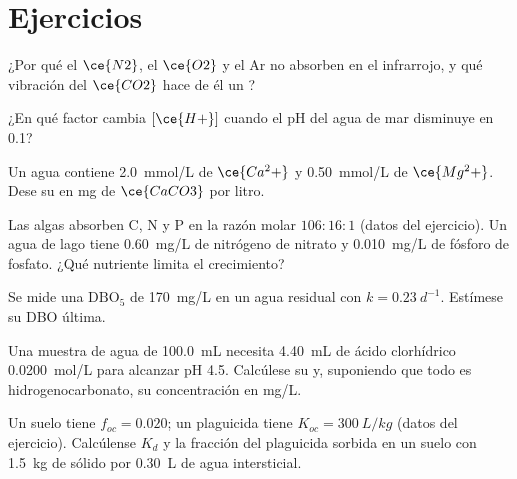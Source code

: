 \section{Ejercicios}

\begin{exercise}[$\star$]\label{exo:b3:environmental-toxicology:1}
¿Por qué el $\ce{N2}$, el $\ce{O2}$ y el Ar no absorben en el infrarrojo, y qué vibración del $\ce{CO2}$ hace de él un
?
\end{exercise}

\begin{exercise}[$\star$]\label{exo:b3:environmental-toxicology:2}
¿En qué factor cambia $[\ce{H+}]$ cuando el pH del agua de mar disminuye en 0.1?
\end{exercise}

\begin{exercise}[$\star$]\label{exo:b3:environmental-toxicology:3}
Un agua contiene \qty{2.0}{mmol/L} de $\ce{Ca^2+}$ y \qty{0.50}{mmol/L} de $\ce{Mg^2+}$. Dese su  en mg de $\ce{CaCO3}$ por litro.
\end{exercise}

\begin{exercise}[$\star$]\label{exo:b3:environmental-toxicology:4}
Las algas absorben C, N y P en la razón molar $106 : 16 : 1$ (datos del ejercicio). Un agua de lago
tiene \qty{0.60}{mg/L} de nitrógeno de nitrato y \qty{0.010}{mg/L} de fósforo de fosfato. ¿Qué nutriente limita
el crecimiento?
\end{exercise}

\begin{exercise}[$\star\star$]\label{exo:b3:environmental-toxicology:5}
Se mide una $\mathrm{DBO_5}$ de \qty{170}{mg/L} en un agua residual con $k = \qty{0.23}{d^{-1}}$. Estímese su DBO última.
\end{exercise}

\begin{exercise}[$\star\star$]\label{exo:b3:environmental-toxicology:6}
Una muestra de agua de \qty{100.0}{mL} necesita \qty{4.40}{mL} de ácido clorhídrico \qty{0.0200}{mol/L} para alcanzar pH 4.5. Calcúlese su
 y, suponiendo que todo es hidrogenocarbonato, su concentración en mg/L.
\end{exercise}

\begin{exercise}[$\star\star$]\label{exo:b3:environmental-toxicology:7}
Un suelo tiene $f_{oc} = 0.020$; un plaguicida tiene $K_{oc} = \qty{300}{L/kg}$ (datos del ejercicio). Calcúlense $K_d$ y la
fracción del plaguicida sorbida en un suelo con \qty{1.5}{kg} de sólido por \qty{0.30}{L} de agua intersticial.
\end{exercise}

